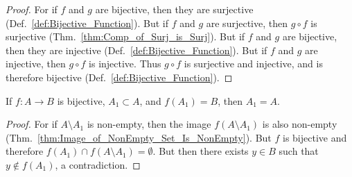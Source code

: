         \begin{proof}
            For if $f$ and $g$ are bijective, then they are surjective
            (Def.~\ref{def:Bijective_Function}). But if $f$ and $g$ are
            surjective, then $g\circ{f}$ is surjective
            (Thm.~\ref{thm:Comp_of_Surj_is_Surj}). But if $f$ and $g$ are
            bijective, then they are injective
            (Def.~\ref{def:Bijective_Function}). But if $f$ and $g$ are
            injective, then $g\circ{f}$ is injective. Thus $g\circ{f}$ is
            surjective and injective, and is therefore bijective
            (Def.~\ref{def:Bijective_Function}).
        \end{proof}
        \begin{theorem}
            If $f:A\rightarrow{B}$ is bijective, $A_{1}\subset{A}$, and
            $f(A_{1})=B$, then $A_{1}=A$.
        \end{theorem}
        \begin{proof}
            For if $A\setminus{A_{1}}$ is non-empty, then the image
            $f(A\setminus{A}_{1})$ is also non-empty
            (Thm.~\ref{thm:Image_of_NonEmpty_Set_Is_NonEmpty}). But $f$ is
            bijective and therefore
            $f(A_{1})\cap{f}(A\setminus{A}_{1})=\emptyset$. But then there
            exists $y\in{B}$ such that $y\notin{f}(A_1)$, a contradiction.
        \end{proof}
    \clearpage
